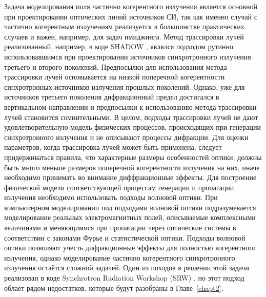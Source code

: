 Задача моделирования поля частично когерентного излучения является основной при проектировании оптических линий источников СИ, так как именно случай с частично когерентным излучениям реализуется в большинстве практических случаев и важен, например, для задач имиджинга. Метод трассировки лучей реализованный, например, в коде SHADOW \cite{sanchez_del_rio_shadow3_2011}, являлся подходом рутинно использовавшимся при проектировании источников синхротронного излучения третьего и второго поколений. Предпосылки для использования метода трассировки лучей основывается на низкой поперечной когерентности синхротронных источников излучения прошлых поколений. Однако, уже для источников третьего поколения дифракционный предел достигался в вертикальном направлении и предпосылки к использованию метода трассировки лучей становится сомнительными. В целом, подходы трассировки лучей не дают удовлетворительную модель физических процессов, происходящих при генерации синхротронного излучения и не описывают процессы дифракции. Для оценки параметров, когда трассировка лучей может быть применена, следует придерживаться правила, что характерные размеры особенностей оптики, должны быть много меньше размеров поперечной когерентности излучения на них, иначе необходимо принимать во внимание диффракционные эффекты.
Для построение физической модели соответствующей процессам генерации и пропагации излучения необходимо использовать подходы волновой оптики. При компьютерном моделировании под подходами волновой оптики подразумевается моделирование реальных электромагнитных полей, описываемые комплексными величинами и меняющимися при пропагации через оптические системы в соответствии с законами Фурье \cite{goodman_introduction_2005} и статистической \cite{goodman_statistical_2015} оптики. Подходы волновой оптики позволяют учесть дифракционные эффекты для полностью когерентного излучения, однако моделирование частично когерентного синхротронного излучения остаётся сложной задачей. Один из походов в решении этой задачи реализован в коде Synchrotron Radiation Workshop (SRW) \cite{chubar_accurate_1998}, но этот подход облает рядом недостатков, которые будут разобраны в Главе~\ref{chapt2}.

